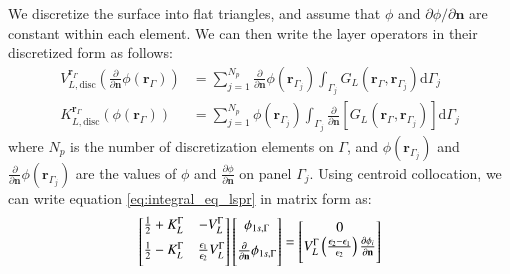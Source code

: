 We discretize the surface into flat triangles, and assume that  $\phi$ and 
$\partial \phi/\partial \mathbf{n}$ are constant within each element. We can
then write the layer operators in their discretized form as follows:
%
\begin{align} \label{eq:layers_disc}
V_{L,\text{disc}}^{\mathbf{r}_\Gamma} \left( \frac{\partial}{\partial \mathbf{n}} \phi(\mathbf{r}_{\Gamma}) \right) &= \sum_{j=1}^{N_p} \frac{\partial}{\partial \mathbf{n}} \phi(\mathbf{r}_{\Gamma_j}) \int_{\Gamma_j} G_L(\mathbf{r}_\Gamma,\mathbf{r}_{\Gamma_j})  \mathrm{d} \Gamma_j  \nonumber \\
K_{L,\text{disc}}^{\mathbf{r}_\Gamma}(\phi(\mathbf{r}_{\Gamma})) &=  \sum_{j=1}^{N_p}\phi(\mathbf{r}_{\Gamma_j})\int_{\Gamma_j} \frac{\partial}{\partial \mathbf{n}} \left[ G_L(\mathbf{r}_\Gamma,\mathbf{r}_{\Gamma_j}) \right]\mathrm{d} \Gamma_j
\end{align}
%
\noindent where $N_p$ is the number of discretization elements on $\Gamma$, 
and $\phi(\mathbf{r}_{\Gamma_j})$ and $\frac{\partial}{\partial \mathbf{n}} 
\phi(\mathbf{r}_{\Gamma_j})$ are the values of $\phi$ and 
$\frac{\partial \phi}{\partial \mathbf{n}}$ on panel $\Gamma_j$.
Using centroid collocation, we can write equation \eqref{eq:integral_eq_lspr} in matrix form as:
%
 \begin{equation} \label{eq:matrix_lspr}
 \left[
    \begin{matrix} 
       \frac{1}{2} + K_{L}^{\Gamma} & -V_{L}^{\Gamma}  \vspace{0.2cm} \\
       \frac{1}{2} - K_{L}^{\Gamma} &  \frac{\epsilon_1}{\epsilon_2} V_{L}^{\Gamma}  \vspace{0.2cm} 
    \end{matrix}
    \right] \left[ 
    \begin{matrix} 
       \phi_{1s,\Gamma} \vspace{0.2cm} \\
       \frac{\partial}{\partial \mathbf{n}} \phi_{1s,\Gamma} \vspace{0.2cm}
    \end{matrix} 
     \right] =   
    \left[
    \begin{matrix} 
       0 \\
       V_{L}^{\Gamma} \left(\frac{\epsilon_2-\epsilon_1}{\epsilon_2}\right) \frac{\partial\phi_i}{\partial\mathbf{n}} \vspace{0.2cm} 
    \end{matrix}
    \right]
 \end{equation}
